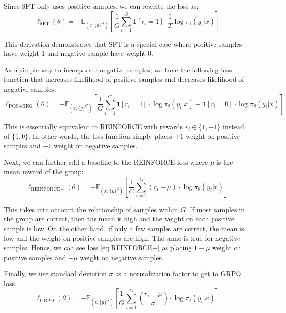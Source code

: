 \documentclass[12pt]{cmuthesis}
\begin{document}
Since SFT only uses positive samples, we can rewrite the loss as:
\begin{equation}
    \ell_{\text{SFT}}(\theta) = - \mathbb{E}_{(x, \{y\}^G)} \left[ \frac{1}{G} \sum_{i = 1}^G \boldsymbol{1}[r_i = 1] \cdot \frac{1}{T} \log \pi_\theta(y_i \vert x) \right]
    \label{eq:SFT}
\end{equation}

This derivation demonstrates that SFT is a special case where positive samples have weight 1 and negative sample have weight 0.

As a simple way to incorporate negative samples, we have the following loss function that increases likelihood of positive samples and decreases likelihood of negative samples:
\begin{equation}
    \ell_{\text{POS+NEG}}(\theta) = - \mathbb{E}_{(x, \{y\}^G)} \left[ \frac{1}{G} \sum_{i = 1}^G \boldsymbol{1}[r_i = 1] \cdot \log \pi_\theta(y_i \vert x) - \boldsymbol{1}[r_i = 0] \cdot \log \pi_\theta(y_i \vert x) \right]
    \label{eq:POS+NEG}
\end{equation}

This is essentially equivalent to REINFORCE \citep{10.1007/BF00992696} with rewards $r_i \in \{1, -1\}$ instead of $\{1, 0\}$. In other words, the loss function simply places $+1$ weight on positive samples and $-1$ weight on negative samples.

Next, we can further add a baseline to the REINFORCE loss where $\mu$ is the mean reward of the group:
\begin{equation}
    \ell_{\text{REINFORCE+}}(\theta) = - \mathbb{E}_{(x, \{y\}^G)} \left[ \frac{1}{G} \sum_{i = 1}^G (r_i - \mu) \cdot \log \pi_\theta(y_i \vert x) \right]
    \label{eq:REINFORCE+}
\end{equation}

This takes into account the relationship of samples within $G$. If most samples in the group are correct, then the mean is high and the weight on each positive sample is low. On the other hand, if only a few samples are correct, the mean is low and the weight on positive samples are high. The same is true for negative samples. Hence, we can see loss \ref{eq:REINFORCE+} as placing $1- \mu$ weight on positive samples and $-\mu$ weight on negative samples.


Finally, we use standard deviation $\sigma$ as a normalization factor to get to GRPO loss.
\begin{equation}
    \ell_{\text{GRPO}}(\theta) = - \mathbb{E}_{(x, \{y\}^G)} \left[ \frac{1}{G} \sum_{i = 1}^G \left( \frac{r_i - \mu}{\sigma} \right) \cdot \log \pi_\theta(y_i \vert x) \right]
    \label{eq:GRPO}
\end{equation}
\end{document}
